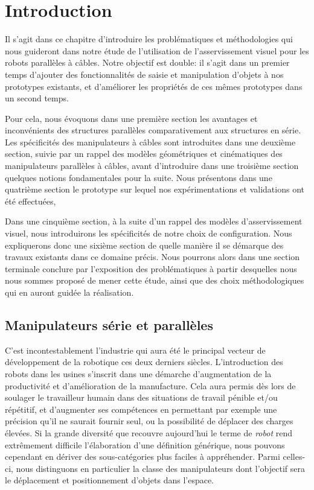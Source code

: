 \section{Introduction}

Il s'agit dans ce chapitre d'introduire les problématiques et méthodologies qui nous guideront dans notre étude de l'utilisation de l'asservissement visuel pour les robots parallèles à c\^ables. Notre objectif est double: il s'agit dans un premier temps d'ajouter des fonctionnalités de saisie et manipulation d'objets à nos prototypes existants, et d'améliorer les propriétés de ces mêmes prototypes dans un second temps.

Pour cela, nous  évoquons dans une première section les avantages et inconvénients des structures parallèles comparativement aux structures en série. Les spécificités des manipulateurs à c\^ables sont introduites dans une deuxième section, suivie par un rappel des modèles géométriques et cinématiques des manipulateurs parallèles à c\^ables, avant d'introduire dans une troisième section quelques notions fondamentales pour la suite. Nous présentons dans une quatrième section le prototype sur lequel nos expérimentations et validations ont été effectuées,

Dans une cinquième section, à la suite d'un rappel des modèles d'asservissement visuel, nous introduirons les spécificités de notre choix de configuration. Nous expliquerons donc une sixième section de quelle manière il se démarque des travaux existants dans ce domaine précis. Nous pourrons alors dans une section terminale conclure par l'exposition des problématiques à partir desquelles nous nous sommes proposé de mener cette étude, ainsi que des choix méthodologiques qui en auront guidée la réalisation.

\subsection{Manipulateurs série et parallèles}

C'est incontestablement l'industrie qui aura été le principal vecteur de développe\-ment de la robotique ces deux derniers siècles. L'introduction des robots dans les usines s'inscrit dans une démarche d'augmentation de la productivité et d'amélio\-ration de la manufacture. Cela aura permis dès lors de soulager le travailleur humain dans des situations de travail pénible et/ou répétitif, et d'augmenter ses compétences en permettant par exemple une précision qu'il ne saurait fournir seul, ou la possibilité de déplacer des charges élevées. Si la grande diversité que recouvre aujourd'hui le terme de {\it robot} rend extrêmement difficile l'élaboration d'une définition générique, nous pouvons cependant en dériver des sous-catégories plus faciles à appréhender. Parmi celles-ci, nous distinguons en particulier la classe des manipulateurs dont l'objectif sera le déplacement et positionnement d'objets dans l'espace.

